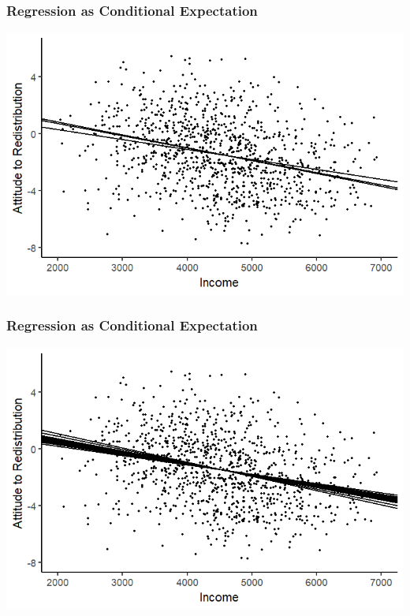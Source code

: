 \documentclass[xcolor=x11names,compress]{beamer}\usepackage[]{graphicx}\usepackage[]{color}
\makeatletter
\def\maxwidth{ %
  \ifdim\Gin@nat@width>\linewidth
    \linewidth
  \else
    \Gin@nat@width
  \fi
}
\newenvironment{knitrout}{}{} %
\renewcommand{\(}{\begin{columns}}
\renewcommand{\)}{\end{columns}}
\newcommand{\<}[1]{\begin{column}{#1}}
\renewcommand{\>}{\end{column}}
\makeatother
\begin{document}
\begin{frame}
\frametitle{Regression as Conditional Expectation}
\begin{knitrout}
\color{fgcolor}
\includegraphics[width=\maxwidth]{figure/cond_exp1f-1} 

\end{knitrout}
\end{frame}

\begin{frame}
\frametitle{Regression as Conditional Expectation}
\begin{knitrout}
\color{fgcolor}
\includegraphics[width=\maxwidth]{figure/cond_exp1g-1} 

\end{knitrout}
\end{frame}
\end{document}
